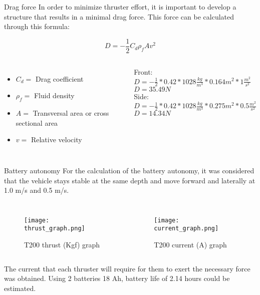 \begin{frame}[c]{Drag force}
  In order to minimize thruster effort, it is important to develop a structure that results in a minimal drag force. This force can be calculated through this formula:   
  
  \begin{equation}
    D = -\frac{1}{2}C_{d} \rho_{f} A v^2
  \end{equation}
  \begin{columns}
      \begin{itemize}
        \item $C_{d} =$ Drag coefficient
        \item $\rho_{f} =$ Fluid density
        \item $A =$ Transversal area or cross sectional area
        \item $v =$ Relative velocity   
      \end{itemize}
    Front: \\
      $D = -\frac{1}{2} * 0.42 * 1028 \frac{kg}{m^3} * 0.164 m^2 * 1 \frac{m^2}{s^2}$ \\
      $D = 35.49 N$ \\
    Side: \\
      $D = -\frac{1}{2} * 0.42 * 1028 \frac{kg}{m^3} * 0.275 m^2 * 0.5 \frac{m^2}{s^2}$ \\
      $D =  14.34 N$
  \end{columns}
  

\end{frame}

\begin{frame}[c]{Battery autonomy}
  For the calculation of the battery autonomy, it was considered that the vehicle stays stable at the same depth and move forward and laterally at 1.0 m/s and 0.5 m/s.

  \begin{columns}
      \begin{figure}[!htb]
        \centering
        \texttt{[image: thrust\_graph.png]}
        \caption{T200 thrust (Kgf) graph}
        \label{thruster}
      \end{figure}
      \begin{figure}[!htb]
        \centering
        \texttt{[image: current\_graph.png]}
        \caption{T200 current (A) graph}
        \label{thruster}
      \end{figure}
  \end{columns}

  The current that each thruster will require for them to exert the necessary force was obtained. Using 2 batteries 18 Ah, battery life of 2.14 hours could be estimated. 
\end{frame}

